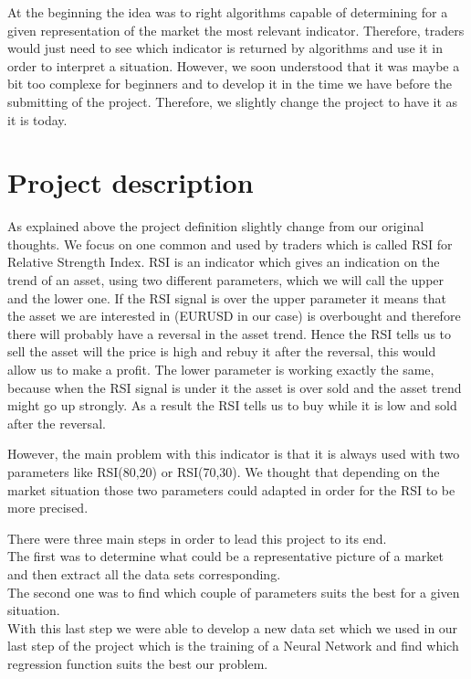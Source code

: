 \documentclass[]{article}
\begin{document}
\vskip 0.5cm 
At the beginning the idea was to right algorithms capable of determining for a given representation of the market the most relevant indicator. Therefore, traders would just need to see which indicator is returned by algorithms and use it in order to interpret a situation. However, we soon understood that it was maybe a bit too complexe for beginners and to develop it in the time we have before the submitting of the project.
Therefore, we slightly change the project to have it as it is today.

\section{Project description}

\vskip 0.5cm
As explained above the project definition slightly change from our original thoughts. We focus on one common and used by traders which is called RSI for Relative Strength Index. RSI is an indicator which gives an indication on the trend of an asset, using two different parameters, which we will call the upper and the lower one. If the RSI signal is over the upper parameter it means that the asset we are interested in (EURUSD in our case) is overbought and therefore there will probably have a reversal in the asset trend. Hence the RSI tells us to sell the asset will the price is high and rebuy it after the reversal, this would allow us to make a profit. The lower parameter is working exactly the same, because when the RSI signal is under it the asset is over sold and the asset trend might go up strongly. As a result the RSI tells us to buy while it is low and sold after the reversal.

\vskip 0.5cm
However, the main problem with this indicator is that it is always used with two parameters like RSI(80,20) or RSI(70,30). We thought that depending on the market situation those two parameters could adapted in order for the RSI to be more precised. 

\vskip 0.5cm
There were three main steps in order to lead this project to its end.\\
The first was to determine what could be a representative picture of a market and then extract all the data sets corresponding.\\
The second one was to find which couple of parameters suits the best for a given situation.\\
With this last step we were able to develop a new data set which we used in our last step of the project which is the training of a Neural Network and find which regression function suits the best our problem.  
\end{document}
